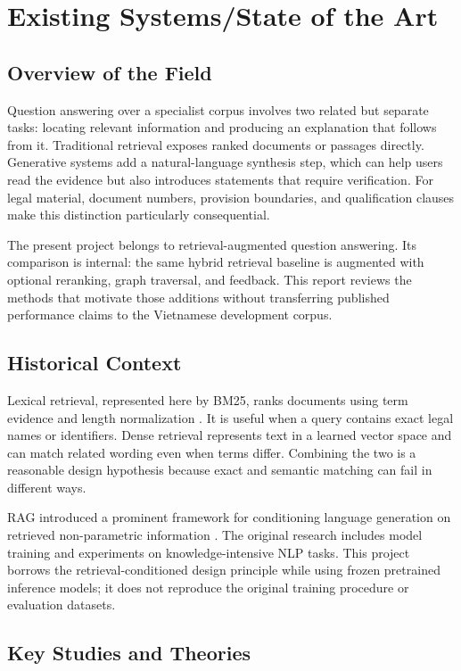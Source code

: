\chapter{Existing Systems/State of the Art}
\section{Overview of the Field}
Question answering over a specialist corpus involves two related but separate tasks: locating relevant information and producing an explanation that follows from it. Traditional retrieval exposes ranked documents or passages directly. Generative systems add a natural-language synthesis step, which can help users read the evidence but also introduces statements that require verification. For legal material, document numbers, provision boundaries, and qualification clauses make this distinction particularly consequential.

The present project belongs to retrieval-augmented question answering. Its comparison is internal: the same hybrid retrieval baseline is augmented with optional reranking, graph traversal, and feedback. This report reviews the methods that motivate those additions without transferring published performance claims to the Vietnamese development corpus.

\section{Historical Context}
Lexical retrieval, represented here by BM25, ranks documents using term evidence and length normalization \citep{robertson2009bm25}. It is useful when a query contains exact legal names or identifiers. Dense retrieval represents text in a learned vector space and can match related wording even when terms differ. Combining the two is a reasonable design hypothesis because exact and semantic matching can fail in different ways.

RAG introduced a prominent framework for conditioning language generation on retrieved non-parametric information \citep{lewis2020rag}. The original research includes model training and experiments on knowledge-intensive NLP tasks. This project borrows the retrieval-conditioned design principle while using frozen pretrained inference models; it does not reproduce the original training procedure or evaluation datasets.

\section{Key Studies and Theories}

